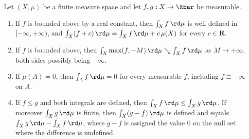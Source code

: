 \begin{lemma}
\label{lem:integration-ledger}
Let $(X,\mu)$ be a finite measure space and let $f,g:X\to\Rbar$ be
measurable.
\begin{enumerate}
\item If $f$ is bounded above by a real constant, then
  $\int_Xf\,\rd\mu$ is well defined in $[-\infty,+\infty)$, and
  $\int_X(f+c)\,\rd\mu=\int_Xf\,\rd\mu+c\,\mu(X)$ for every $c\in\mathbf R$.
\item If $f$ is bounded above, then
  $\int_X\max(f,-M)\,\rd\mu\searrow\int_Xf\,\rd\mu$ as $M\to+\infty$, both
  sides possibly being $-\infty$.
\item If $\mu(A)=0$, then $\int_Af\,\rd\mu=0$ for every measurable $f$,
  including $f\equiv-\infty$ on $A$.
\item If $f\leq g$ and both integrals are defined, then
  $\int_Xf\,\rd\mu\leq\int_Xg\,\rd\mu$.  If moreover
  $\int_Xg\,\rd\mu$ is finite, then $\int_X(g-f)\,\rd\mu$ is defined and
  equals $\int_Xg\,\rd\mu-\int_Xf\,\rd\mu$, where $g-f$ is assigned
  the value $0$ on the null set where the difference is undefined.
\end{enumerate}
\par
\end{lemma}

